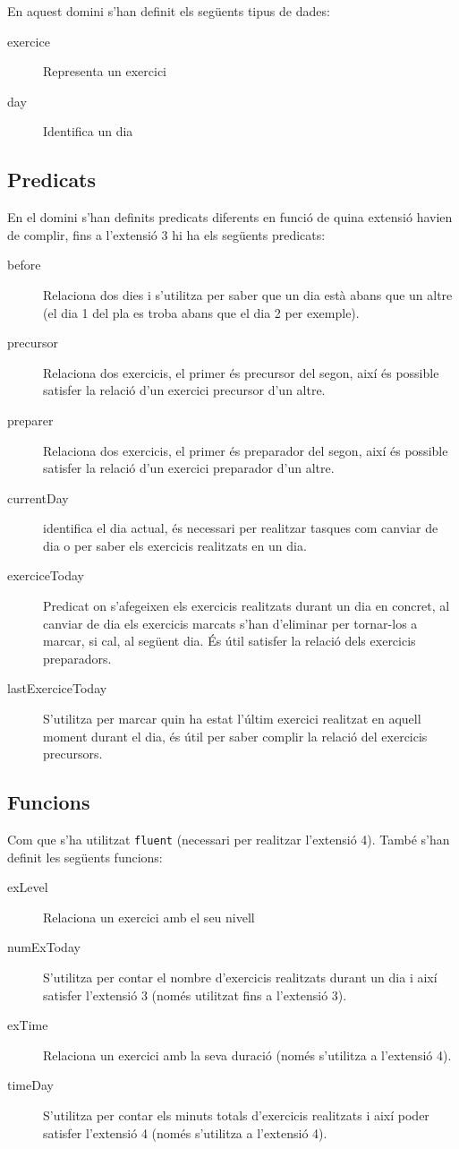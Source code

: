 \documentclass[a4paper,12pt, UTF-8]{article}
\begin{document}
En aquest domini s'han definit els següents tipus de dades:
\begin{description}
	\item[exercice] Representa un exercici
	\item[day] Identifica un dia
\end{description}

\subsection{Predicats}

En el domini s'han definits predicats diferents en funció de quina extensió havien de complir, fins a l'extensió 3 hi ha els següents predicats:
\begin{description}
	\item[before] Relaciona dos dies i s'utilitza per saber que un dia està abans que un altre (el dia 1 del pla es troba abans que el dia 2 per exemple).
	\item[precursor] Relaciona dos exercicis, el primer és precursor del segon, així és possible satisfer la relació d'un exercici precursor d'un altre.
	\item[preparer] Relaciona dos exercicis, el primer és preparador del segon, així és possible satisfer la relació d'un exercici preparador d'un altre.
	\item[currentDay] identifica el dia actual, és necessari per realitzar tasques com canviar de dia o per saber els exercicis realitzats en un dia.
	\item[exerciceToday] Predicat on s'afegeixen els exercicis realitzats durant un dia en concret, al canviar de dia els exercicis marcats s'han d'eliminar per tornar-los a marcar, si cal, al següent dia. És útil satisfer la relació dels exercicis preparadors.
	\item[lastExerciceToday] S'utilitza per marcar quin ha estat l'últim exercici realitzat en aquell moment durant el dia, és útil per saber complir la relació del exercicis precursors. 
\end{description}

\subsection{Funcions}

Com que s'ha utilitzat \verb|fluent| (necessari per realitzar l'extensió 4). També s'han definit les següents funcions:
\begin{description}
	\item[exLevel] Relaciona un exercici amb el seu nivell
	\item[numExToday] S'utilitza per contar el nombre d'exercicis realitzats durant un dia i així satisfer l'extensió 3 (només utilitzat fins a l'extensió 3).
	\item[exTime] Relaciona un exercici amb la seva duració (només s'utilitza a l'extensió 4).
	\item[timeDay] S'utilitza per contar els minuts totals d'exercicis realitzats i així poder satisfer l'extensió 4 (només s'utilitza a l'extensió 4).
\end{description}
\end{document}
